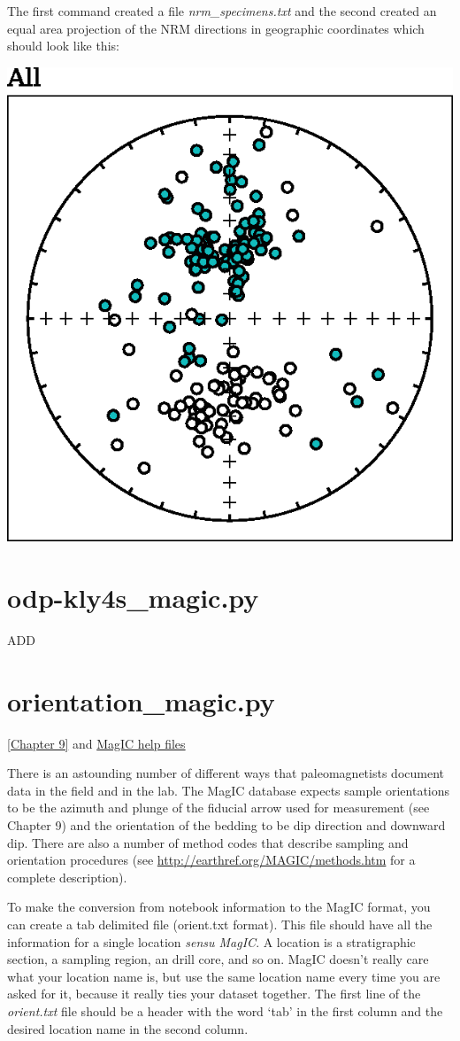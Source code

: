 \documentclass[11pt]{book}
\begin{document}
{{ The first command created a file {\it nrm\_specimens.txt} and the second created an equal area projection of the NRM directions in geographic coordinates which should look like this:
 
\includegraphics[width=10 cm]{EPSfiles/nrm-eq.eps}
% 

\section{odp-kly4s\_magic.py}

ADD


 \section{orientation\_magic.py}
 \href{http://Webbook2.html}{[Chapter 9]} and \href{http://earthref.org/MAGIC/help:749/#orient}{MagIC help files}
 
 There is an astounding number of different ways that paleomagnetists document data in the field and in the lab.  The MagIC database expects sample orientations to be the azimuth and plunge of the fiducial arrow used for measurement (see Chapter 9) and the orientation of the bedding to be dip direction and downward dip.  
  There are also a number of method codes that describe sampling and orientation procedures (see \url{http://earthref.org/MAGIC/methods.htm} for a complete description).  
 
 To make the conversion from notebook information to the MagIC format,  you can create a tab delimited file (orient.txt format).   This file should have all the information for a single location {\it sensu MagIC}.  A location is a stratigraphic section,  a sampling region,  an drill core, and so on.  MagIC doesn't really care what your location name is, but use the same location name every time you are asked for it, because it really ties your dataset together.   The first line of the {\it orient.txt} file should be a  header
 with the word `tab' in the first column and the desired location name in the second column.  
 
}}
\end{document}
